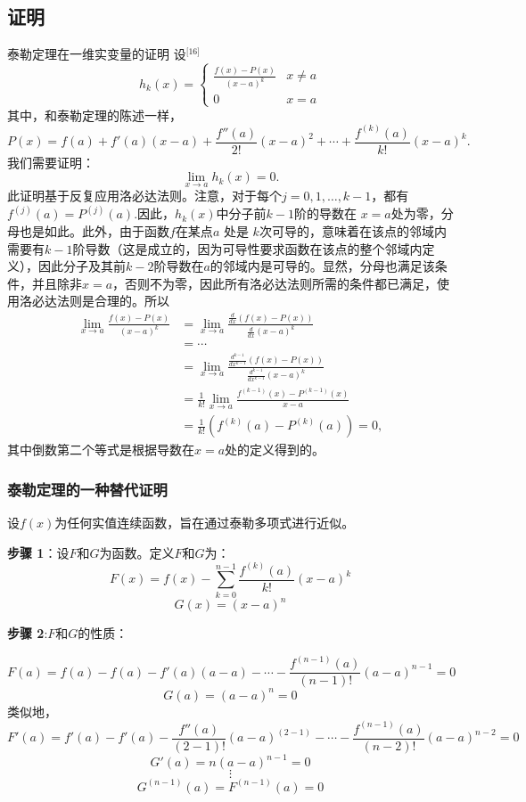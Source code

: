 \subsection{证明}  
泰勒定理在一维实变量的证明  
设\(^\text{[16]}\)
\[
h_k(x) = 
\begin{cases} 
\frac{f(x) - P(x)}{(x - a)^k} & x \neq a \\
0 & x = a
\end{cases}~
\]
其中，和泰勒定理的陈述一样，
\[
P(x) = f(a) + f'(a)(x - a) + \frac{f''(a)}{2!}(x - a)^2 + \cdots + \frac{f^{(k)}(a)}{k!}(x - a)^k.~
\]
我们需要证明：
\[
\lim_{x \to a} h_k(x) = 0.~
\]
此证明基于反复应用洛必达法则。注意，对于每个\( j = 0, 1, \dots, k-1 \)，都有\(f^{(j)}(a) = P^{(j)}(a)\).因此，\( h_k(x) \)中分子前\( k - 1 \)阶的导数在 \( x = a \)处为零，分母也是如此。此外，由于函数\( f \)在某点\( a \) 处是 \( k \)次可导的，意味着在该点的邻域内需要有\( k - 1 \)阶导数（这是成立的，因为可导性要求函数在该点的整个邻域内定义），因此分子及其前\( k - 2 \)阶导数在\( a \)的邻域内是可导的。显然，分母也满足该条件，并且除非\( x = a \)，否则不为零，因此所有洛必达法则所需的条件都已满足，使用洛必达法则是合理的。所以
\[
\begin{aligned}
\lim_{x \to a} \frac{f(x) - P(x)}{(x - a)^k} &= \lim_{x \to a} \frac{\frac{d}{dx} (f(x) - P(x))}{\frac{d}{dx} (x - a)^k} \\
&= \cdots  \\
&= \lim_{x \to a} \frac{\frac{d^{k-1}}{dx^{k-1}} (f(x) - P(x))}{\frac{d^{k-1}}{dx^{k-1}} (x - a)^k}\\
&= \frac{1}{k!} \lim_{x \to a} \frac{f^{(k-1)}(x) - P^{(k-1)}(x)}{x - a} \\
&= \frac{1}{k!} (f^{(k)}(a) - P^{(k)}(a)) = 0,
\end{aligned}~
\]
其中倒数第二个等式是根据导数在\( x = a \)处的定义得到的。
\subsubsection{泰勒定理的一种替代证明}   
设\( f(x) \)为任何实值连续函数，旨在通过泰勒多项式进行近似。

\textbf{步骤 1}：设\( F \)和\( G \)为函数。定义\( F \)和\( G \)为：
\[
F(x) = f(x) - \sum_{k=0}^{n-1} \frac{f^{(k)}(a)}{k!} (x - a)^k~
\]
\[
G(x) = (x - a)^n~
\]

\textbf{步骤 2}:\( F \)和\( G \)的性质：

\[
F(a) = f(a) - f(a) - f'(a)(a - a) - \cdots - \frac{f^{(n-1)}(a)}{(n-1)!} (a - a)^{n-1} = 0~
\]
\[
G(a) = (a - a)^n = 0~
\]
类似地，
\[
F'(a) = f'(a) - f'(a) - \frac{f''(a)}{(2-1)!}(a - a)^{(2-1)} - \cdots - \frac{f^{(n-1)}(a)}{(n-2)!}(a - a)^{n-2} = 0~
\]
\[
G'(a) = n(a - a)^{n-1} = 0~
\]
\[
\vdots~
\]
\[
G^{(n-1)}(a) = F^{(n-1)}(a) = 0~
\]

